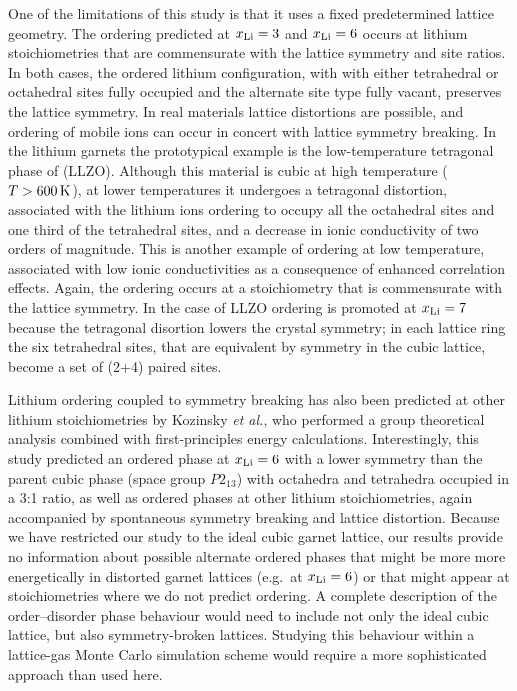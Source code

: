 \documentclass[aps,prb,twocolumn,superscriptaddress,reprint]{revtex4-1}
\newcommand{\xLi}{x_\m{Li}}
\begin{document}
One of the limitations of this study is that it uses a fixed predetermined lattice geometry. The ordering predicted at $\xLi=3$ and $\xLi=6$ occurs at  lithium stoichiometries that are commensurate with the lattice symmetry and site ratios. In both cases, the ordered lithium configuration, with with either tetrahedral or octahedral sites fully occupied and the alternate site type fully vacant, preserves the lattice symmetry. In real materials lattice distortions are possible, and ordering of mobile ions can occur in concert with lattice symmetry breaking. In the lithium garnets the prototypical example is the low-temperature tetragonal phase of  (LLZO).\cite{BernsteinEtAl_PhysRevLett2012,AwakaEtAl_ChemLett2011} Although this material is cubic at high temperature ($T>600\,\mathrm{K}$), at lower temperatures it undergoes a tetragonal distortion, associated with the lithium ions ordering to occupy all the octahedral sites and one third of the tetrahedral sites, and a decrease in ionic conductivity of two orders of magnitude. This is another example of ordering at low temperature, associated with low ionic conductivities as a consequence of enhanced correlation effects.\cite{BurbanoEtAl_PhysRevLett2016} Again, the ordering occurs at a stoichiometry that is commensurate with the lattice symmetry. In the case of LLZO ordering is promoted at $\xLi=7$ because the tetragonal disortion lowers the crystal symmetry; in each lattice ring the six tetrahedral sites, that are equivalent by symmetry in the cubic lattice, become a set of (2+4) paired sites. 

Lithium ordering coupled to symmetry breaking has also been predicted at other lithium stoichiometries by Kozinsky \emph{et al.},\cite{KozinskyEtAl_PhysRevLett2016} who performed a group theoretical analysis combined with first-principles energy calculations. Interestingly, this study predicted an ordered phase at $\xLi=6$ with a lower symmetry than the parent cubic phase (space group $P2_13$) with octahedra and tetrahedra occupied in a 3:1 ratio, as well as ordered phases at other lithium stoichiometries, again accompanied by spontaneous symmetry breaking and lattice distortion. Because we have restricted our study to the ideal cubic garnet lattice, our results provide no information about possible alternate ordered phases that might be more more energetically in distorted garnet lattices (e.g.\ at $\xLi=6$) or that might appear at stoichiometries where we do not predict ordering. A complete description of the order--disorder phase behaviour would need to include not only the ideal cubic lattice, but also symmetry-broken lattices. Studying this behaviour within a lattice-gas Monte Carlo simulation scheme would require a more sophisticated approach than used here.
\end{document}

